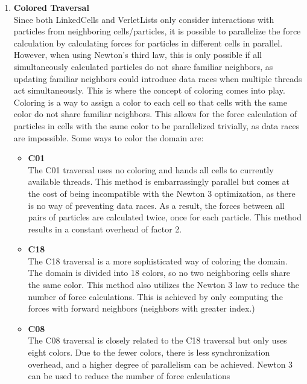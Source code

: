 \begin{enumerate}[label=\textbf{\arabic*.}]
\begin{enumerate}
                  \item \textbf{Colored Traversal} \\
                        Since both LinkedCells and VerletLists only consider interactions with particles from neighboring cells/particles, it is possible to parallelize the force calculation by calculating forces for particles in different cells in parallel. However, when using Newton's third law, this is only possible if all simultaneously calculated particles do not share familiar neighbors, as updating familiar neighbors could introduce data races when multiple threads act simultaneously. This is where the concept of coloring comes into play. Coloring is a way to assign a color to each cell so that cells with the same color do not share familiar neighbors. This allows for the force calculation of particles in cells with the same color to be parallelized trivially, as data races are impossible. Some ways to color the domain are:
                        \begin{itemize}
                              \item \textbf{C01} \\
                                    The C01 traversal uses no coloring and hands all cells to currently available threads. This method is embarrassingly parallel but comes at the cost of being incompatible with the Newton 3 optimization, as there is no way of preventing data races. As a result, the forces between all pairs of particles are calculated twice, once for each particle. This method results in a constant overhead of factor 2.

                              \item \textbf{C18} \\
                                    The C18 traversal is a more sophisticated way of coloring the domain. The domain is divided into 18 colors, so no two neighboring cells share the same color. This method also utilizes the Newton 3 law to reduce the number of force calculations. This is achieved by only computing the forces with forward neighbors (neighbors with greater index.) ~\cite{GRATL2022108262}

                              \item \textbf{C08} \\
                                    The C08 traversal is closely related to the C18 traversal but only uses eight colors. Due to the fewer colors, there is less synchronization overhead, and a higher degree of parallelism can be achieved. Newton 3 can be used to reduce the number of force calculations
                        \end{itemize}


\end{enumerate}
\end{enumerate}
